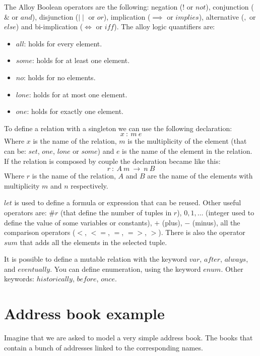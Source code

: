 \documentclass[12pt, a4paper]{report}
\newtheorem[style=M,bodystyle=\normalfont]{theorem}{Theorem}
\newtheorem[style=M,bodystyle=\normalfont]{corollary}{Corollary}
\newtheorem[style=M,bodystyle=\normalfont]{lemma}{Lemma}
\newtheorem[style=M,bodystyle=\normalfont]{definition}{Definition}
\begin{document}
        The Alloy Boolean operators are the following: negation ($!$ or $not$), conjunction ($\&$ or $and$), disjunction ($\mid \mid$ or $or$), implication ($\implies$ or $implies$), alternative ($,$ or $else$) and bi-implication ($\iff$ or $iff$). The alloy logic quantifiers are: 
        \begin{itemize}
            \item $all$: holds for every element.
            \item $some$: holds for at least one element.
            \item $no$: holds for no elements.
            \item $lone$: holds for at most one element.
            \item $one$: holds for exactly one element.
        \end{itemize}
        To define a relation with a singleton we can use the following declaration: 
        \[x \: : \: m \: e\]
        Where $x$ is the name of the relation, $m$ is the multiplicity of the element (that can be: $set$, $one$, $lone$ or $some$) and $e$ is the name of the element in the relation. If the relation is composed by couple the declaration became like this: 
        \[r \: : \: A \: m \: \rightarrow \: n \: B\]
        Where $r$ is the name of the relation, $A$ and $B$ are the name of the elements with multiplicity $m$ and $n$ respectively.
         
        $let$ is used to define a formula or expression that can be reused. Other useful operators are: $\# r$ (that define the number of tuples in $r$), $0,1,\dots$ (integer used to define the value of some variables or constants), $+$ (plus), $-$ (minus), all the comparison operators ($<$, $<=$, $=$, $=>$, $>$). There is also the operator $sum$ that adds all the elements in the selected tuple. 

        It is possible to define a mutable relation with the keyword $var$, $after$, $always$, and $eventually$. You can define enumeration, using the keyword $enum$. Other keywords: 
        $historically$, $before$, $once$. 

        \section{Address book example}
        Imagine that we are asked to model a very simple address book. The books that contain a bunch of addresses linked to the corresponding names. 
        
\end{document}
